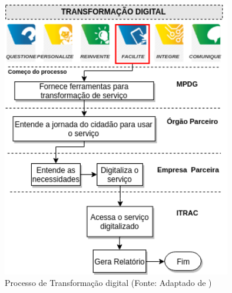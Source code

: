         \begin{figure}[h]
          \centering
          \includegraphics[width=10cm]{figuras/secao-referencial/ProcessodeContextualizacao.png}
          \caption{Processo de Transformação digital (Fonte: Adaptado de \cite{itkonen2015test})} 
          \label{fig:transformacao}
        
        \end{figure}
